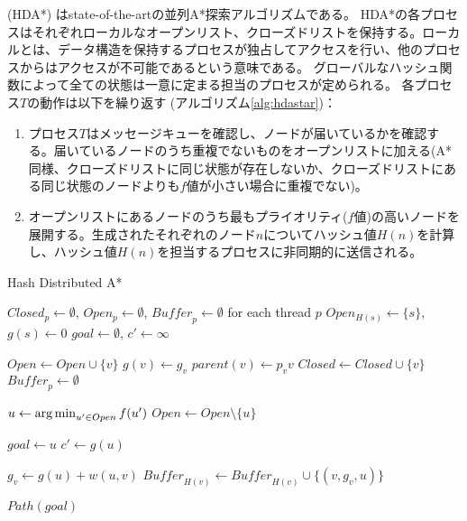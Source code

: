  (HDA*) \cite{kishimotofb13}はstate-of-the-artの並列A*探索アルゴリズムである。
HDA*の各プロセスはそれぞれローカルなオープンリスト、クローズドリストを保持する。ローカルとは、データ構造を保持するプロセスが独占してアクセスを行い、他のプロセスからはアクセスが不可能であるという意味である。
グローバルなハッシュ関数によって全ての状態は一意に定まる担当のプロセスが定められる。
各プロセス$T$の動作は以下を繰り返す (アルゴリズム\ref{alg:hdastar})：

\begin{enumerate}
	\item 
		プロセス$T$はメッセージキューを確認し、ノードが届いているかを確認する。届いているノードのうち重複でないものをオープンリストに加える(A*同様、クローズドリストに同じ状態が存在しないか、クローズドリストにある同じ状態のノードよりも$f$値が小さい場合に重複でない)。
	\item 
		オープンリストにあるノードのうち最もプライオリティ($f$値)の高いノードを展開する。生成されたそれぞれのノード$n$についてハッシュ値$H(n)$を計算し、ハッシュ値$H(n)$を担当するプロセスに非同期的に送信される。
\end{enumerate}


\begin{algorithm}
  \caption{Hash Distributed A*}
  $Closed_p \leftarrow \emptyset$, $Open_p \leftarrow \emptyset$, $\mathit{Buffer}_p \leftarrow \emptyset$ for each thread $p$\;
  $Open_{H(s)} \leftarrow \{s\}$, $g(s) \leftarrow 0$\;
  $goal \leftarrow \emptyset$, $c' \leftarrow \infty$\;

   {
   {
     {
       {
        $Open \leftarrow Open \cup \{v\}$\;
	$g(v) \leftarrow g_v$\;
        $parent(v) \leftarrow p_vv$\;
      }
       {
        $Closed \leftarrow Closed \cup \{v\}$\;
      }
    }
    $\mathit{Buffer}_p \leftarrow \emptyset$\;
     {
      $u \leftarrow \operatorname*{arg\,min}_{u' \in Open} f(u')$ \;
      $Open \leftarrow Open \setminus \{u\} $\;

       {
        $goal \leftarrow u$\;
        $c' \leftarrow g(u)$\;        
      }

       {
        $g_v \leftarrow g(u) + w(u, v)$\;
        $\mathit{Buffer}_{H(v)} \leftarrow \mathit{Buffer}_{H(v)} \cup \{(v, g_v, u)\}$\;
      }
    }
  }
  \Return $Path(goal)$\;
  }
  \label{alg:hdastar}
\end{algorithm}

